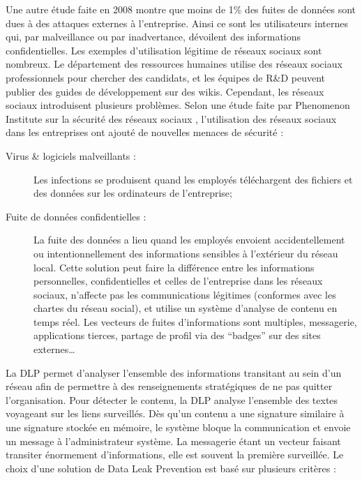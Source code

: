 Une autre étude faite en 2008 montre que moins de 1\% des fuites de données sont
dues à des attaques externes à l’entreprise.  \cite{dlp-whitepaper}  Ainsi ce
sont les utilisateurs internes qui, par malveillance ou par inadvertance,
dévoilent des informations confidentielles. Les exemples d'utilisation légitime
de réseaux sociaux sont nombreux. Le département des ressources humaines utilise
des réseaux sociaux professionnels pour chercher des candidats, et les équipes
de R\&D peuvent publier des guides de développement sur des wikis.  Cependant,
les réseaux sociaux introduisent plusieurs problèmes. Selon une étude faite par
Phenomenon Institute sur la sécurité des réseaux sociaux
\cite{social-media-risks}, l’utilisation des réseaux sociaux dans les
entreprises ont ajouté de nouvelles menaces de sécurité :

\begin{description}

\item[Virus \& logiciels malveillants :] Les infections se produisent quand les
employés téléchargent des fichiers et des données sur les ordinateurs de
l’entreprise;

\item[Fuite de données confidentielles :] La fuite des données a lieu quand les
employés envoient accidentellement ou intentionnellement des informations
sensibles à l’extérieur du réseau local. \cite{combating-data-leaks} Cette
solution peut faire la différence entre les informations personnelles,
confidentielles et celles de l’entreprise dans les réseaux sociaux, n’affecte
pas les communications légitimes (conformes avec les chartes du réseau social),
et utilise un système d’analyse de contenu en temps réel. Les vecteurs de fuites
d'informations sont multiples, messagerie, applications tierces, partage de
profil via des ``badges'' sur des sites externes\ldots

\end{description}

La DLP permet d'analyser l'ensemble des informations transitant au sein d'un
réseau afin de permettre à des renseignements stratégiques de ne pas quitter
l'organisation. Pour détecter le contenu, la DLP analyse l'ensemble des textes
voyageant sur les liens surveillés. Dès qu'un contenu a une signature similaire
à une signature stockée en mémoire, le système bloque la communication et envoie
un message à l'administrateur système. La messagerie étant un vecteur faisant
transiter énormement d'informations, elle est souvent la première surveillée.
Le choix d’une solution de Data Leak Prevention est basé sur plusieurs critères :

